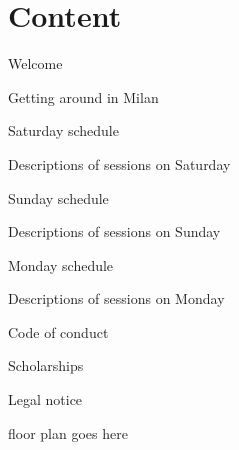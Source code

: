\section*{Content}

\vspace*{0.35em}%
\noindent Welcome\dotfill \pageref{welcome}

\vspace*{0.35em}%
\noindent Getting around in Milan\dotfill \pageref{milan}

\vspace*{0.35em}%
\noindent Saturday schedule\dotfill \pageref{saturday}

\vspace*{0.35em}%
\noindent Descriptions of sessions on Saturday \dotfill \pageref{saturday-abstracts}

\vspace*{0.35em}%
\noindent Sunday schedule \dotfill \pageref{sunday}

\vspace*{0.35em}%
\noindent Descriptions of sessions on Sunday \dotfill \pageref{sunday-abstracts}

\vspace*{0.35em}%
\noindent Monday schedule \dotfill \pageref{monday}

\vspace*{0.35em}%
\noindent Descriptions of sessions on Monday \dotfill \pageref{monday-abstracts}

\vspace*{0.35em}%
\noindent Code of conduct \dotfill \pageref{coc}

\vspace*{0.35em}%
\noindent Scholarships \dotfill \pageref{scholarships}

\vspace*{0.35em}%
\noindent Legal notice \dotfill \pageref{legal}

\vfill
floor plan goes here

\newpage
